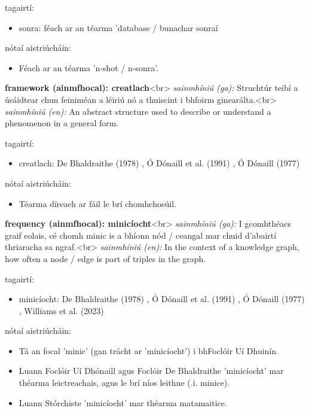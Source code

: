 \documentclass{article}
\begin{document}
tagairtí:
\begin{itemize}
	\item sonra: féach ar an téarma 'database / bunachar sonraí
\end{itemize}

nótaí aistriúcháin:
\begin{itemize}
	\item Féach ar an téarma 'n-shot / n-sonra'.
\end{itemize}


\textbf{framework (ainmfhocal): creatlach}<br>
\textit{sainmhíniú (ga):} Struchtúr teibí a úsáidtear chun feiniméan a léiriú nó a thuiscint i bhfoirm ginearálta.<br>
\textit{sainmhíniú (en):} An abstract structure used to describe or understand a phenomenon in a general form.

tagairtí:
\begin{itemize}
	\item creatlach: De Bhaldraithe (1978) \cite{de-bhaldraithe}, Ó Dónaill et al. (1991) \cite{focloir-beag}, Ó Dónaill (1977) \cite{odonaill}
\end{itemize}

nótaí aistriúcháin:
\begin{itemize}
	\item Téarma díreach ar fáil le brí chomhchosúil.
\end{itemize}


\textbf{frequency (ainmfhocal): minicíocht}<br>
\textit{sainmhíniú (ga):} I gcomhthéacs graif eolais, cé chomh minic is a bhíonn nód / ceangal mar chuid d'abairtí thriaracha sa ngraf.<br>
\textit{sainmhíniú (en):} In the context of a knowledge graph, how often a node / edge is part of triples in the graph.

tagairtí:
\begin{itemize}
	\item minicíocht: De Bhaldraithe (1978) \cite{de-bhaldraithe}, Ó Dónaill et al. (1991) \cite{focloir-beag}, Ó Dónaill (1977) \cite{odonaill}, Williams et al. (2023) \cite{storchiste}
\end{itemize}

nótaí aistriúcháin:
\begin{itemize}
	\item Tá an focal 'minic' (gan trácht ar 'minicíocht') i bhFoclóir Uí Dhuinín.
	\item Luann Foclóir Uí Dhónaill agus Foclóir De Bhaldraithe 'minicíocht' mar théarma leictreachais, agus le brí níos leithne (.i. minice).
	\item Luann Stórchiste 'minicíocht' mar théarma matamaitice.
\end{itemize}
\end{document}
